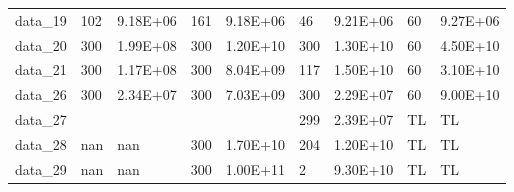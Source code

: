 \begin{table}[!h]
\begin{tabular}{lllllllll}
data\_19 & 102                                      & 9.18E+06                                     & 161                                       & 9.18E+06                                      & 46                                        & 9.21E+06                                     & 60                                        & 9.27E+06                                     \\
data\_20 & 300                                      & 1.99E+08                                     & 300                                       & 1.20E+10                                      & 300                                       & 1.30E+10                                     & 60                                        & 4.50E+10                                     \\
data\_21 & 300                                      & 1.17E+08                                     & 300                                       & 8.04E+09                                      & 117                                       & 1.50E+10                                     & 60                                        & 3.10E+10                                     \\
data\_26 & 300                                      & 2.34E+07                                     & 300                                       & 7.03E+09                                      & 300                                       & 2.29E+07                                     & 60                                        & 9.00E+10                                     \\
data\_27 &                                          &                                              &                                           &                                               & 299                                       & 2.39E+07                                     & TL                                        & TL                                           \\
data\_28 & nan                                      & nan                                          & 300                                       & 1.70E+10                                      & 204                                       & 1.20E+10                                     & TL                                        & TL                                           \\
data\_29 & nan                                      & nan                                          & 300                                       & 1.00E+11                                      & 2                                         & 9.30E+10                                     & TL                                        & TL                                           \\ \hline
\end{tabular}
\end{table}